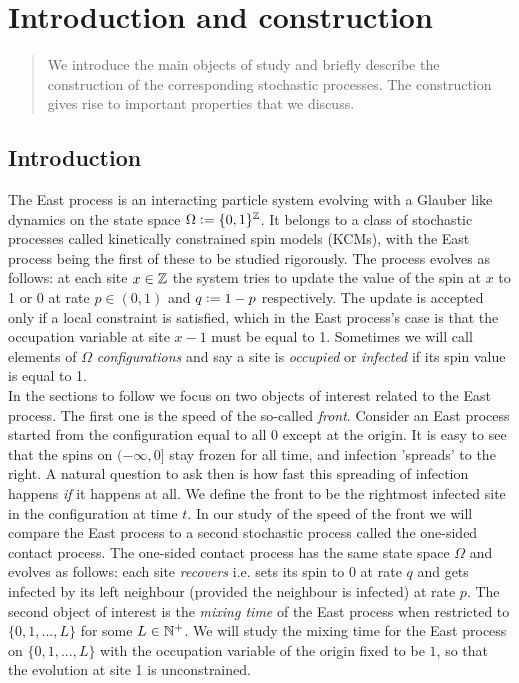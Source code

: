 \section{Introduction and construction}\label{dec:introduction}

\begin{quote}
{\small We introduce the main objects of study and briefly describe the construction of the corresponding stochastic processes. The construction gives rise to important properties that we discuss. }
\end{quote}

\subsection{Introduction}\label{ssec:introduction}
The East process is an interacting particle system evolving with a Glauber like dynamics on the state space $\Omega \vcentcolon= \{0,1\}^{\mathbb{Z}}$. It belongs to a class of stochastic processes called kinetically constrained spin models (KCMs), with the East process being the first of these to be studied rigorously. The process evolves as follows: at each site $x \in \mathbb{Z}$ the system tries to update the value of the spin at $x$ to 1 or 0 at rate $p \in (0,1)$ and $q \vcentcolon= 1 - p$ respectively. The update is accepted only if a local constraint is satisfied, which in the East process's case is that the occupation variable at site $x-1$ must be equal to 1. Sometimes we will call elements of $\Omega$ \textit{configurations} and say a site is \textit{occupied} or \textit{infected} if its spin value is equal to 1. \\

In the sections to follow we focus on two objects of interest related to the East process. The first one is the speed of the so-called \textit{front}. Consider an East process started from the configuration equal to all 0 except at the origin. It is easy to see that the spins on $(-\infty, 0]$ stay frozen for all time, and infection 'spreads' to the right. A natural question to ask then is how fast this spreading of infection happens \textit{if} it happens at all. We define the front to be the rightmost infected site in the configuration at time $t$. In our study of the speed of the front we will compare the East process to a second stochastic process called the one-sided contact process. The one-sided contact process has the same state space $\Omega$ and evolves as follows: each site \textit{recovers} i.e. sets its spin to 0 at rate $q$ and gets infected by its left neighbour (provided the neighbour is infected) at rate $p$. The second object of interest is the \textit{mixing time} of the East process when restricted to $\{ 0, 1, ..., L\}$ for some $L \in \mathbb{N}^+$. We will study the mixing time for the East process on $\{ 0, 1, ..., L\}$ with the occupation variable of the origin fixed to be $1$, so that the evolution at site 1 is unconstrained. \\

